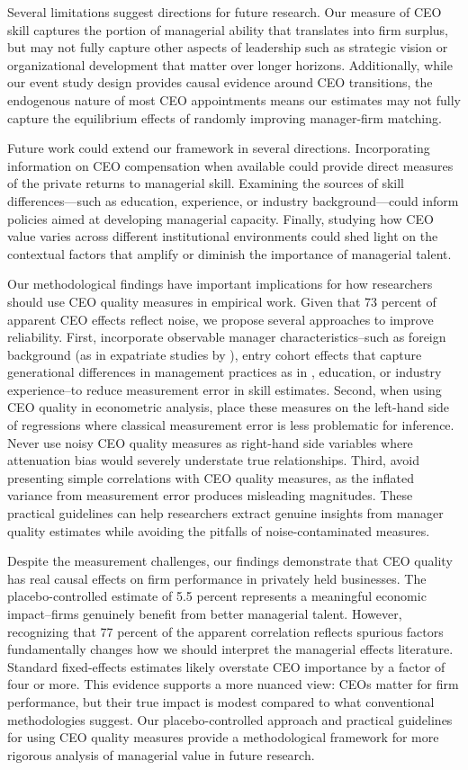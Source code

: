 \documentclass[11pt,a4paper]{article}
\begin{document}
Several limitations suggest directions for future research. Our measure of CEO skill captures the portion of managerial ability that translates into firm surplus, but may not fully capture other aspects of leadership such as strategic vision or organizational development that matter over longer horizons. Additionally, while our event study design provides causal evidence around CEO transitions, the endogenous nature of most CEO appointments means our estimates may not fully capture the equilibrium effects of randomly improving manager-firm matching.

Future work could extend our framework in several directions. Incorporating information on CEO compensation when available could provide direct measures of the private returns to managerial skill. Examining the sources of skill differences---such as education, experience, or industry background---could inform policies aimed at developing managerial capacity. Finally, studying how CEO value varies across different institutional environments could shed light on the contextual factors that amplify or diminish the importance of managerial talent.

Our methodological findings have important implications for how researchers should use CEO quality measures in empirical work. Given that 73 percent of apparent CEO effects reflect noise, we propose several approaches to improve reliability. First, incorporate observable manager characteristics\---such as foreign background (as in expatriate studies by \citet{Koren2023expat}), entry cohort effects that capture generational differences in management practices as in \citet{koren2024managers}, education, or industry experience\---to reduce measurement error in skill estimates. Second, when using CEO quality in econometric analysis, place these measures on the left-hand side of regressions where classical measurement error is less problematic for inference. Never use noisy CEO quality measures as right-hand side variables where attenuation bias would severely understate true relationships. Third, avoid presenting simple correlations with CEO quality measures, as the inflated variance from measurement error produces misleading magnitudes. These practical guidelines can help researchers extract genuine insights from manager quality estimates while avoiding the pitfalls of noise-contaminated measures.

Despite the measurement challenges, our findings demonstrate that CEO quality has real causal effects on firm performance in privately held businesses. The placebo-controlled estimate of 5.5 percent represents a meaningful economic impact\---firms genuinely benefit from better managerial talent. However, recognizing that 77 percent of the apparent correlation reflects spurious factors fundamentally changes how we should interpret the managerial effects literature. Standard fixed-effects estimates likely overstate CEO importance by a factor of four or more. This evidence supports a more nuanced view: CEOs matter for firm performance, but their true impact is modest compared to what conventional methodologies suggest. Our placebo-controlled approach and practical guidelines for using CEO quality measures provide a methodological framework for more rigorous analysis of managerial value in future research.
\end{document}
